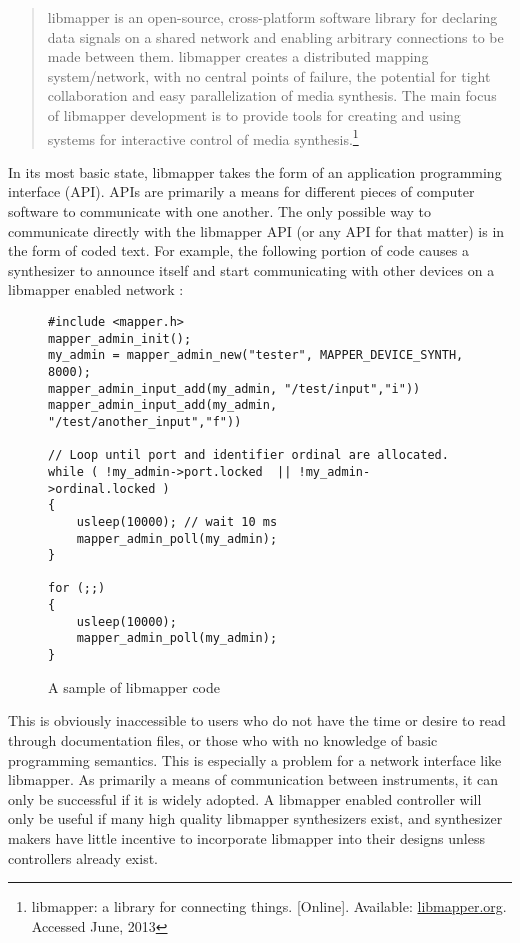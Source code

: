 \begin{quote} 
libmapper is an open-source, cross-platform software library for declaring data signals on a shared network and enabling arbitrary connections to be made between them. libmapper creates a distributed mapping system/network, with no central points of failure, the potential for tight collaboration and easy parallelization of media synthesis. The main focus of libmapper development is to provide tools for creating and using systems for interactive control of media synthesis.\footnote{libmapper: a library for connecting things. [Online]. Available: \url{libmapper.org}. Accessed June, 2013}
\end{quote}

In its most basic state, libmapper takes the form of an application programming interface (API). APIs are primarily a means for different pieces of computer software to communicate with one another. The only possible way to communicate directly with the libmapper API (or any API for that matter) is in the form of coded text. For example, the following portion of code causes a synthesizer to announce itself and start communicating with other devices on a libmapper enabled network :

\begin{figure}[h!]
\begin{lstlisting}[]
#include <mapper.h>
mapper_admin_init();
my_admin = mapper_admin_new("tester", MAPPER_DEVICE_SYNTH, 8000); 
mapper_admin_input_add(my_admin, "/test/input","i")) 
mapper_admin_input_add(my_admin, "/test/another_input","f"))

// Loop until port and identifier ordinal are allocated. 
while ( !my_admin->port.locked	|| !my_admin->ordinal.locked )
{
	usleep(10000); // wait 10 ms 
	mapper_admin_poll(my_admin);
}

for (;;) 
{
	usleep(10000);
	mapper_admin_poll(my_admin); 
}
\end{lstlisting}
\caption{A sample of libmapper code}
\end{figure}

This is obviously inaccessible to users who do not have the time or desire to read through documentation files, or those who with no knowledge of basic programming semantics. This is especially a problem for a network interface like libmapper. As primarily a means of communication between instruments, it can only be successful if it is widely adopted. A libmapper enabled controller will only be useful if many high quality libmapper synthesizers exist, and synthesizer makers have little incentive to incorporate libmapper into their designs unless controllers already exist. 

